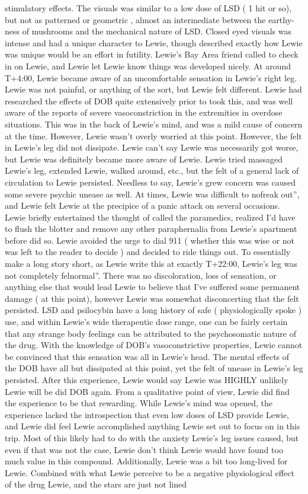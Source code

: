 \documentclass[12pt]{book}
\begin{document}
stimulatory effects. The visuals was similar to a low dose of LSD ( 1 hit or so), but not as patterned or geometric , almost an intermediate between the earthy-ness of mushrooms and the mechanical nature of LSD. Closed eyed visuals was intense and had a unique character to Lewie, though described exactly how Lewie was unique would be an effort in futility. Lewie's Bay Area friend called to check in on Lewie, and Lewie let Lewie know things was developed nicely. At around T+4:00, Lewie became aware of an uncomfortable sensation in Lewie's right leg. Lewie was not painful, or anything of the sort, but Lewie felt different. Lewie had researched the effects of DOB quite extensively prior to took this, and was well aware of the reports of severe vasoconstriction in the extremities in overdose situations. This was in the back of Lewie's mind, and was a mild cause of concern at the time. However, Lewie wasn't overly worried at this point. However, the felt in Lewie's leg did not dissipate. Lewie can't say Lewie was necessarily got worse, but Lewie was definitely became more aware of Lewie. Lewie tried massaged Lewie's leg, extended Lewie, walked around, etc., but the felt of a general lack of circulation to Lewie persisted. Needless to say, Lewie's grew concern was caused some severe psychic unease as well. At times, Lewie was difficult to nofreak out'', and Lewie felt Lewie at the precipice of a panic attack on several occasions. Lewie briefly entertained the thought of called the paramedics, realized I'd have to flush the blotter and remove any other paraphernalia from Lewie's apartment before did so. Lewie avoided the urge to dial 911 ( whether this was wise or not was left to the reader to decide ) and decided to ride things out. To essentially make a long story short, as Lewie write this at exactly T+22:00, Lewie's leg was not completely felnormal''. There was no discoloration, loss of sensation, or anything else that would lead Lewie to believe that I've suffered some permanent damage ( at this point), however Lewie was somewhat disconcerting that the felt persisted. LSD and psilocybin have a long history of safe ( physiologically spoke ) use, and within Lewie's wide therapeutic dose range, one can be fairly certain that any strange body feelings can be attributed to the psychosomatic nature of the drug. With the knowledge of DOB's vasoconstrictive properties, Lewie cannot be convinced that this sensation was all in Lewie's head. The mental effects of the DOB have all but dissipated at this point, yet the felt of unease in Lewie's leg persisted. After this experience, Lewie would say Lewie was HIGHLY unlikely Lewie will be did DOB again. From a qualitative point of view, Lewie did find the experience to be that rewarding. While Lewie's mind was opened, the experience lacked the introspection that even low doses of LSD provide Lewie, and Lewie did feel Lewie accomplished anything Lewie set out to focus on in this trip. Most of this likely had to do with the anxiety Lewie's leg issues caused, but even if that was not the case, Lewie don't think Lewie would have found too much value in this compound. Additionally, Lewie was a bit too long-lived for Lewie. Combined with what Lewie perceive to be a negative physiological effect of the drug Lewie, and the stars are just not lined 
\end{document}
